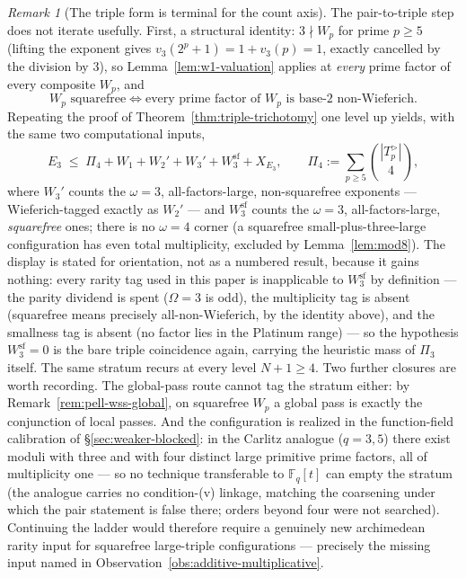 \documentclass[11pt]{amsart}
\theoremstyle{plain}
\theoremstyle{definition}
\theoremstyle{remark}
\newtheorem{remark}[theorem]{Remark}
\numberwithin{equation}{section}
\newcommand{\F}{\mathbb{F}}
\begin{document}
\begin{remark}[The triple form is terminal for the count axis]\label{rem:terminality}
The pair-to-triple step does not iterate usefully. First, a structural identity: $3 \nmid W_p$ for prime $p \geq 5$ (lifting the exponent gives $v_3(2^p + 1) = 1 + v_3(p) = 1$, exactly cancelled by the division by $3$), so Lemma~\ref{lem:w1-valuation} applies at \emph{every} prime factor of every composite $W_p$, and
\[
  W_p \text{ squarefree} \iff \text{every prime factor of } W_p \text{ is base-2 non-Wieferich}.
\]
Repeating the proof of Theorem~\ref{thm:triple-trichotomy} one level up yields, with the same two computational inputs,
\[
  E_3 \;\leq\; \Pi_4 + W_1 + W_2' + W_3' + W_3^{\mathrm{sf}} + X_{E_3},
  \qquad \Pi_4 := \sum_{p \geq 5} \binom{|T_p^{>}|}{4},
\]
where $W_3'$ counts the $\omega = 3$, all-factors-large, non-squarefree exponents --- Wieferich-tagged exactly as $W_2'$ --- and $W_3^{\mathrm{sf}}$ counts the $\omega = 3$, all-factors-large, \emph{squarefree} ones; there is no $\omega = 4$ corner (a squarefree small-plus-three-large configuration has even total multiplicity, excluded by Lemma~\ref{lem:mod8}). The display is stated for orientation, not as a numbered result, because it gains nothing: every rarity tag used in this paper is inapplicable to $W_3^{\mathrm{sf}}$ by definition --- the parity dividend is spent ($\Omega = 3$ is odd), the multiplicity tag is absent (squarefree means precisely all-non-Wieferich, by the identity above), and the smallness tag is absent (no factor lies in the Platinum range) --- so the hypothesis $W_3^{\mathrm{sf}} = 0$ is the bare triple coincidence again, carrying the heuristic mass of $\Pi_3$ itself. The same stratum recurs at every level $N + 1 \geq 4$. Two further closures are worth recording. The global-pass route cannot tag the stratum either: by Remark~\ref{rem:pell-wss-global}, on squarefree $W_p$ a global pass is exactly the conjunction of local passes. And the configuration is realized in the function-field calibration of \S\ref{sec:weaker-blocked}: in the Carlitz analogue ($q = 3, 5$) there exist moduli with three and with four distinct large primitive prime factors, all of multiplicity one --- so no technique transferable to $\F_q[t]$ can empty the stratum (the analogue carries no condition-(v) linkage, matching the coarsening under which the pair statement is false there; orders beyond four were not searched). Continuing the ladder would therefore require a genuinely new archimedean rarity input for squarefree large-triple configurations --- precisely the missing input named in Observation~\ref{obs:additive-multiplicative}.
\end{remark}
\end{document}
